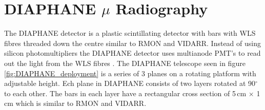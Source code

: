 \section{DIAPHANE $\mu$ Radiography} \label{sec:DIAPHANEmuRadiography}
The DIAPHANE detector is a plastic scintillating detector with bars with WLS fibres threaded down the centre similar to RMON and VIDARR. Instead of using silicon photomultipliers the DIAPHANE detector uses multianode PMT’s to read out the light from the WLS fibres \cite{Marteau_2017}. The DIAPHANE telescope seen in figure \ref{fig:DIAPHANE_deployment} is a series of 3 planes on a rotating platform with adjustable height. Ech plane in DIAPHANE consists of two layers rotated at 90$^\circ$ to each other. The bars in each layer have a rectangular cross section of 5\,cm $\times$ 1\,cm \cite{MARTEAU201223} which is similar to RMON and VIDARR. 
